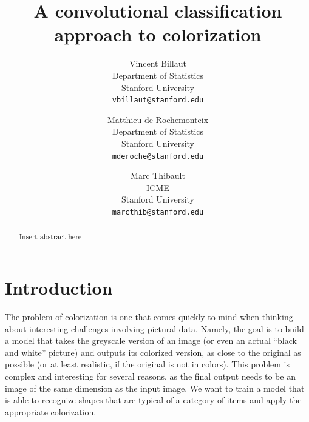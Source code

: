 \documentclass[10pt,twocolumn,letterpaper]{article}
\begin{document}
\title{A convolutional classification approach to colorization}

\author{Vincent Billaut\\
Department of Statistics\\
Stanford University\\
{\tt\small vbillaut@stanford.edu}
\and
Matthieu de Rochemonteix\\
Department of Statistics\\
Stanford University\\
{\tt\small mderoche@stanford.edu}
\and
Marc Thibault\\
ICME\\
Stanford University\\
{\tt\small marcthib@stanford.edu}
}

\maketitle



\begin{abstract}
Insert abstract here
\end{abstract}

\section*{Introduction}

The problem of colorization is one that comes quickly to mind when thinking about interesting challenges involving pictural data. Namely, the goal is to build a model that takes the greyscale version of an image (or even an actual ``black and white'' picture) and outputs its colorized version, as close to the original as possible (or at least realistic, if the original is not in colors). This problem is complex and interesting for several reasons, as the final output needs to be an image of the same dimension as the input image. We want to train a model that is able to recognize shapes that are typical of a category of items and apply the appropriate colorization.
\end{document}
